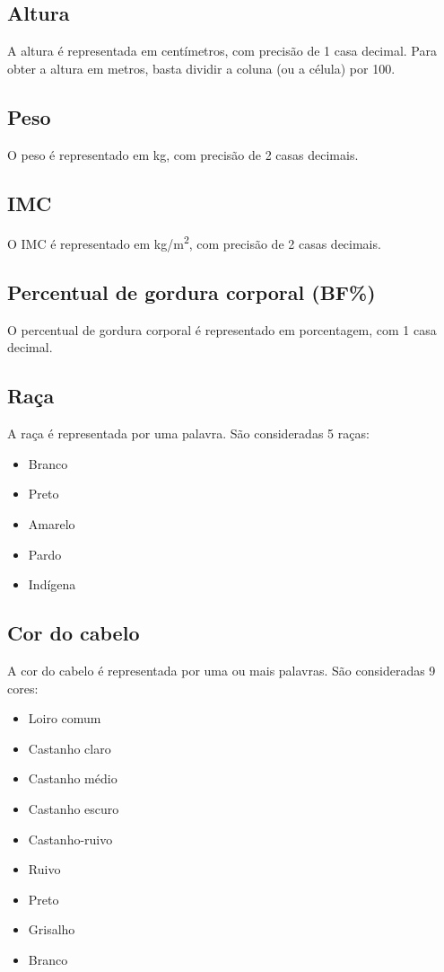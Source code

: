 \documentclass{book}
\begin{document}
\subsection{Altura}
A altura é representada em centímetros, com precisão de 1 casa decimal. Para obter a altura em metros, basta dividir a coluna (ou a célula) por 100.

\subsection{Peso}
O peso é representado em kg, com precisão de 2 casas decimais.

\subsection{IMC}
O IMC é representado em kg/m\textsuperscript{2}, com precisão de 2 casas decimais.

\subsection{Percentual de gordura corporal (BF\%)}
O percentual de gordura corporal é representado em porcentagem, com 1 casa decimal.

\subsection{Raça}
A raça é representada por uma palavra. São consideradas 5 raças:
\begin{itemize}
  \item Branco
  \item Preto
  \item Amarelo
  \item Pardo
  \item Indígena
\end{itemize}

\subsection{Cor do cabelo}
A cor do cabelo é representada por uma ou mais palavras. São consideradas 9 cores:
\begin{itemize}
  \item Loiro comum  %
  \item Castanho claro
  \item Castanho médio
  \item Castanho escuro
  \item Castanho-ruivo
  \item Ruivo
  \item Preto
  \item Grisalho
  \item Branco
\end{itemize}
\end{document}
